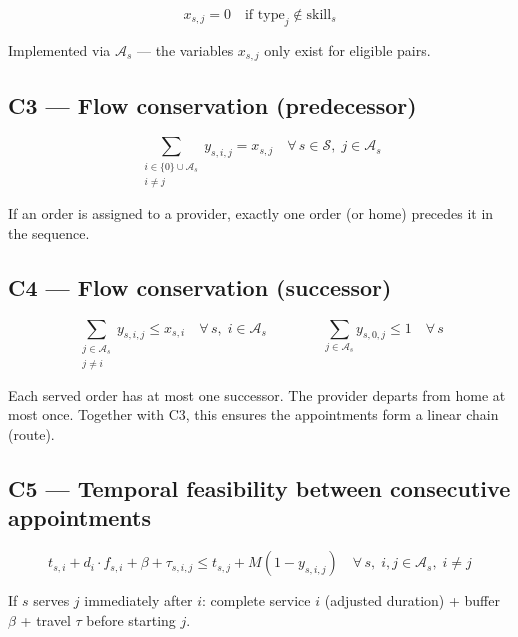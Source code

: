 \documentclass[11pt,a4paper]{article}
\begin{document}
\begin{equation}
x_{s,j} = 0 \quad \text{if } \text{type}_j \notin \text{skill}_s
\end{equation}

Implemented via $\mathcal{A}_s$ --- the variables $x_{s,j}$ only exist for eligible pairs.

\subsection{C3 --- Flow conservation (predecessor)}

\begin{equation}
\sum_{\substack{i \in \{0\} \cup \mathcal{A}_s \\ i \neq j}} y_{s,i,j} = x_{s,j} \quad \forall\, s \in \mathcal{S},\; j \in \mathcal{A}_s
\end{equation}

If an order is assigned to a provider, exactly one order (or home) precedes it in the sequence.

\subsection{C4 --- Flow conservation (successor)}

\begin{equation}
\sum_{\substack{j \in \mathcal{A}_s \\ j \neq i}} y_{s,i,j} \leq x_{s,i} \quad \forall\, s,\; i \in \mathcal{A}_s
\qquad\qquad
\sum_{j \in \mathcal{A}_s} y_{s,0,j} \leq 1 \quad \forall\, s
\end{equation}

Each served order has at most one successor. The provider departs from home at most once. Together with C3, this ensures the appointments form a linear chain (route).

\subsection{C5 --- Temporal feasibility between consecutive appointments}

\begin{equation}
t_{s,i} + d_i \cdot f_{s,i} + \beta + \tau_{s,i,j} \leq t_{s,j} + M(1 - y_{s,i,j}) \quad \forall\, s,\; i,j \in \mathcal{A}_s,\; i \neq j
\end{equation}

If $s$ serves $j$ immediately after $i$: complete service $i$ (adjusted duration) + buffer $\beta$ + travel $\tau$ before starting $j$.
\end{document}
